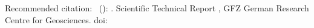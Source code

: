 {	%
	{\footnotesize
		
		Recommended citation:		 									\newline\newline
		\@author\ (\rstPublicationYear): \@title. Scientific Technical Report \rstStrNum, GFZ German Research Centre for Geosciences. doi: \rstDoi 				\newline\newline\newline
		\if\relax\rstSupplDatasets\relax{}\fi   \newline\newline
		\rstSupplDatasets 													\newline\newline\newline
		\if\relax\rstCitationChapter\relax{}\fi   \newline\newline
		\rstCitationChapter 													\newline\newline\newline
		\if\relax\rstSupplementsTo\relax{}\fi   \newline\newline
		\rstSupplementsTo 													\newline\newline\newline
		
}}
